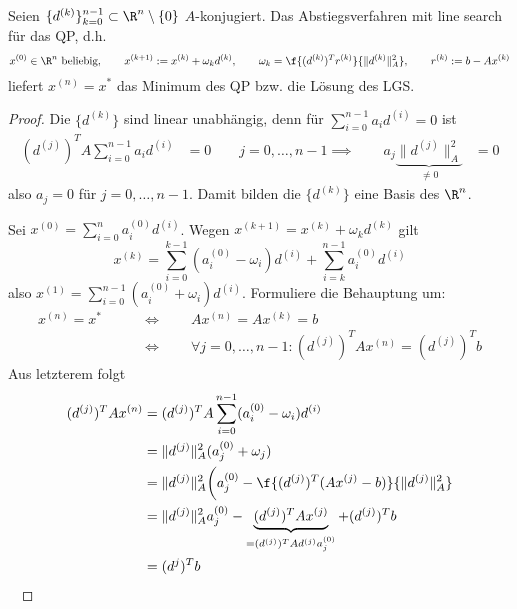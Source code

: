 \documentclass[11pt]{scrartcl}
\begin{document}
\begin{st}[Konvergenz] \label{4.17}
	Seien $\{d^{(k)}\}_{k=0}^{n-1} \subset \R^n \setminus \{0\}$ $A$-konjugiert.
	Das Abstiegsverfahren mit line search für das QP, d.h.
	\[
		x^{(0)} \in \R^n \text{ beliebig},
		\qquad x^{(k+1)} := x^{(k)} + \omega_k d^{(k)},
		\qquad \omega_k = \f{(d^{(k)})^T r^{(k)}}{\|d^{(k)}\|_A^2},
		\qquad r^{(k)} := b - Ax^{(k)}
	\]
	liefert $x^{(n)} = x^*$ das Minimum des QP bzw. die Lösung des LGS.
	\begin{proof}
		Die $\{d^{(k)}\}$ sind linear unabhängig, denn für $\sum_{i=0}^{n-1} a_i d^{(i)} = 0$ ist
		\begin{align*}
			(d^{(j)})^T A \sum_{i=0}^{n-1} a_i d^{(i)} &= 0  \qquad j= 0, \dotsc, n-1
			\implies \qquad a_j \underbrace{\|d^{(j)}\|_A^2}_{\neq 0} &= 0 
		\end{align*}
		also $a_j = 0$ für $j=0,\dotsc,n-1$.
		Damit bilden die $\{d^{(k)}\}$ eine Basis des $\R^n$.

		Sei $x^{(0)} = \sum_{i=0}^n a_i^{(0)} d^{(i)}$.
		Wegen $x^{(k+1)} = x^{(k)} + \omega_k d^{(k)}$ gilt
		\[
			x^{(k)} = \sum_{i=0}^{k-1} (a_i^{(0)} - \omega_i)d^{(i)} + \sum_{i=k}^{n-1} a_i^{(0)} d^{(i)}
		\]
		also $x^{(1)} = \sum_{i=0}^{n-1} (a_i^{(0)}+\omega_i) d^{(i)}$.
		Formuliere die Behauptung um:
		\begin{align*}
			x^{(n)} = x^* \qquad &\iff \qquad Ax^{(n)} = A x^{(k)} = b \\
			\qquad &\iff \qquad \forall j=0,\dotsc,n-1 : (d^{(j)})^T A x^{(n)} = (d^{(j)})^T b
		\end{align*}
		Aus letzterem folgt
		\begin{align*}
			(d^{(j)})^T A x^{(n)} 
			&= (d^{(j)})^T A \sum_{i=0}^{n-1} (a_i^{(0)}-\omega_i) d^{(i)} \\
			&= \|d^{(j)}\|_A^2 (a_j^{(0)}+\omega_j) \\
			&= \|d^{(j)}\|_A^2 \bigg( a_j^{(0)} - \f{(d^{(j)})^T (Ax^{(j)}-b)}{\|d^{(j)}\|_A^2} \\
			&= \|d^{(j)}\|_A^2 a_j^{(0)} - \underbrace{(d^{(j)})^T Ax^{(j)}}_{= (d^{(j)})^T A d^{(j)}a_j^{(0)}} + (d^{(j)})^T b \\
			&= (d^{j})^T b
		\end{align*}~
	\end{proof}
\end{st}
\end{document}
